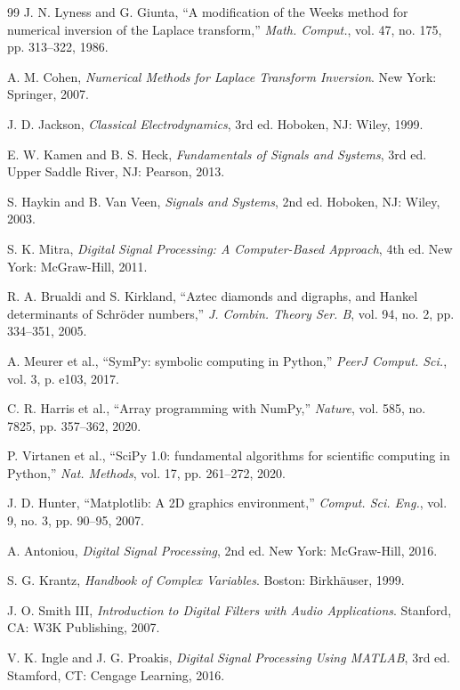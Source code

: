 \documentclass[conference]{IEEEtran}
\begin{document}
\begin{thebibliography}{99}
J. N. Lyness and G. Giunta, ``A modification of the Weeks method for numerical inversion of the Laplace transform,'' \textit{Math. Comput.}, vol. 47, no. 175, pp. 313--322, 1986.

A. M. Cohen, \textit{Numerical Methods for Laplace Transform Inversion}. New York: Springer, 2007.

J. D. Jackson, \textit{Classical Electrodynamics}, 3rd ed. Hoboken, NJ: Wiley, 1999.

E. W. Kamen and B. S. Heck, \textit{Fundamentals of Signals and Systems}, 3rd ed. Upper Saddle River, NJ: Pearson, 2013.

S. Haykin and B. Van Veen, \textit{Signals and Systems}, 2nd ed. Hoboken, NJ: Wiley, 2003.

S. K. Mitra, \textit{Digital Signal Processing: A Computer-Based Approach}, 4th ed. New York: McGraw-Hill, 2011.

R. A. Brualdi and S. Kirkland, ``Aztec diamonds and digraphs, and Hankel determinants of Schröder numbers,'' \textit{J. Combin. Theory Ser. B}, vol. 94, no. 2, pp. 334--351, 2005.

A. Meurer et al., ``SymPy: symbolic computing in Python,'' \textit{PeerJ Comput. Sci.}, vol. 3, p. e103, 2017.

C. R. Harris et al., ``Array programming with NumPy,'' \textit{Nature}, vol. 585, no. 7825, pp. 357--362, 2020.

P. Virtanen et al., ``SciPy 1.0: fundamental algorithms for scientific computing in Python,'' \textit{Nat. Methods}, vol. 17, pp. 261--272, 2020.

J. D. Hunter, ``Matplotlib: A 2D graphics environment,'' \textit{Comput. Sci. Eng.}, vol. 9, no. 3, pp. 90--95, 2007.

A. Antoniou, \textit{Digital Signal Processing}, 2nd ed. New York: McGraw-Hill, 2016.

S. G. Krantz, \textit{Handbook of Complex Variables}. Boston: Birkhäuser, 1999.

J. O. Smith III, \textit{Introduction to Digital Filters with Audio Applications}. Stanford, CA: W3K Publishing, 2007.

V. K. Ingle and J. G. Proakis, \textit{Digital Signal Processing Using MATLAB}, 3rd ed. Stamford, CT: Cengage Learning, 2016.


\end{thebibliography}
\end{document}

